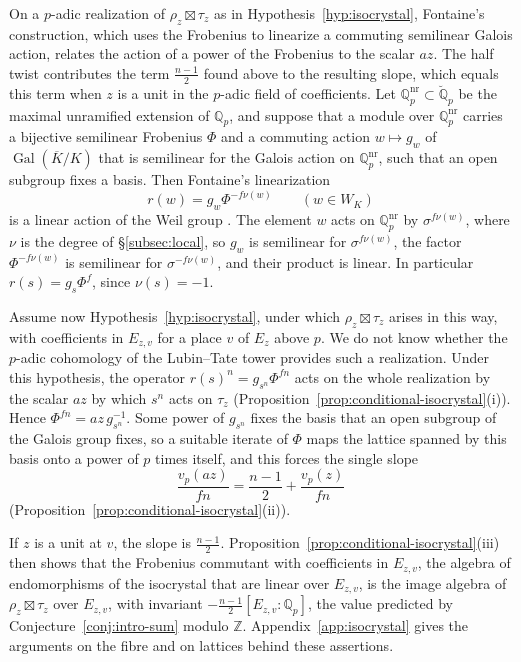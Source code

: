 \documentclass[a4paper,11pt]{amsart}
\theoremstyle{definition}
\theoremstyle{remark}
\numberwithin{equation}{section}
\newcommand{\Q}{\mathbb{Q}}
\newcommand{\Z}{\mathbb{Z}}
\DeclareMathOperator{\Gal}{Gal}
\newcommand{\Qb}{\breve{\mathbb{Q}}_p}
\begin{document}
On a $p$-adic realization of $\rho_z\boxtimes\tau_z$ as in Hypothesis~\ref{hyp:isocrystal}, Fontaine's construction, which uses the Frobenius to linearize a commuting semilinear Galois action, relates the action of a power of the Frobenius to the scalar $az$. The half twist contributes the term $\frac{n-1}2$ found above to the resulting slope, which equals this term when $z$ is a unit in the $p$-adic field of coefficients. Let $\Q_p^{\mathrm{nr}}\subset\Qb$ be the maximal unramified extension of $\Q_p$, and suppose that a module over $\Q_p^{\mathrm{nr}}$ carries a bijective semilinear Frobenius $\Phi$ and a commuting action $w\mapsto g_w$ of $\Gal(\overline K/K)$ that is semilinear for the Galois action on $\Q_p^{\mathrm{nr}}$, such that an open subgroup fixes a basis. Then Fontaine's linearization
\[
 r(w)=g_w\Phi^{-f\nu(w)}\qquad(w\in W_K)
\]
is a linear action of the Weil group \cite[1.3.1 and~1.3.5]{Fon94}. The element $w$ acts on $\Q_p^{\mathrm{nr}}$ by $\sigma^{f\nu(w)}$, where $\nu$ is the degree of \S\ref{subsec:local}, so $g_w$ is semilinear for $\sigma^{f\nu(w)}$, the factor $\Phi^{-f\nu(w)}$ is semilinear for $\sigma^{-f\nu(w)}$, and their product is linear. In particular $r(s)=g_s\Phi^f$, since $\nu(s)=-1$.

Assume now Hypothesis~\ref{hyp:isocrystal}, under which $\rho_z\boxtimes\tau_z$ arises in this way, with coefficients in $E_{z,v}$ for a place $v$ of $E_z$ above $p$. We do not know whether the $p$-adic cohomology of the Lubin--Tate tower provides such a realization. Under this hypothesis, the operator $r(s)^n=g_{s^n}\Phi^{fn}$ acts on the whole realization by the scalar $az$ by which $s^n$ acts on $\tau_z$ (Proposition~\ref{prop:conditional-isocrystal}(i)). Hence $\Phi^{fn}=az\,g_{s^n}^{-1}$. Some power of $g_{s^n}$ fixes the basis that an open subgroup of the Galois group fixes, so a suitable iterate of $\Phi$ maps the lattice spanned by this basis onto a power of $p$ times itself, and this forces the single slope
\[
 \frac{v_p(az)}{fn}=\frac{n-1}2+\frac{v_p(z)}{fn}
\]
(Proposition~\ref{prop:conditional-isocrystal}(ii)).

If $z$ is a unit at $v$, the slope is $\frac{n-1}2$. Proposition~\ref{prop:conditional-isocrystal}(iii) then shows that the Frobenius commutant with coefficients in $E_{z,v}$, the algebra of endomorphisms of the isocrystal that are linear over $E_{z,v}$, is the image algebra of $\rho_z\boxtimes\tau_z$ over $E_{z,v}$, with invariant $-\frac{n-1}2[E_{z,v}:\Q_p]$, the value predicted by Conjecture~\ref{conj:intro-sum} modulo $\Z$. Appendix~\ref{app:isocrystal} gives the arguments on the fibre and on lattices behind these assertions.
\end{document}
